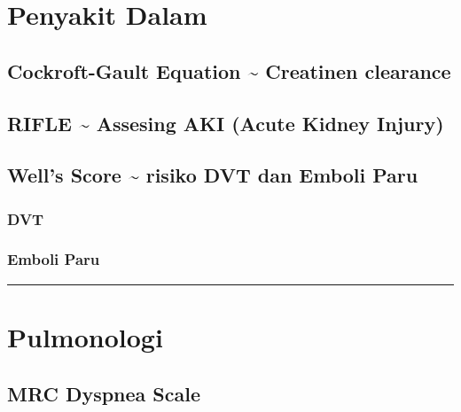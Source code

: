 \documentclass[
]{book}
\begin{document}
\hypertarget{penyakit-dalam}{%
\section{Penyakit Dalam}\label{penyakit-dalam}}

\hypertarget{cockroft-gault-equation-creatinen-clearance}{%
\subsection{Cockroft-Gault Equation \textasciitilde{} Creatinen clearance}\label{cockroft-gault-equation-creatinen-clearance}}

\hypertarget{rifle-assesing-aki-acute-kidney-injury}{%
\subsection{RIFLE \textasciitilde{} Assesing AKI (Acute Kidney Injury)}\label{rifle-assesing-aki-acute-kidney-injury}}

\hypertarget{wells-score-risiko-dvt-dan-emboli-paru}{%
\subsection{Well's Score \textasciitilde{} risiko DVT dan Emboli Paru}\label{wells-score-risiko-dvt-dan-emboli-paru}}

\hypertarget{dvt}{%
\subsubsection{DVT}\label{dvt}}

\hypertarget{emboli-paru}{%
\subsubsection{Emboli Paru}\label{emboli-paru}}

\begin{center}\rule{0.5\linewidth}{0.5pt}\end{center}

\hypertarget{pulmonologi}{%
\section{Pulmonologi}\label{pulmonologi}}

\hypertarget{mrc-dyspnea-scale}{%
\subsection{MRC Dyspnea Scale}\label{mrc-dyspnea-scale}}
\end{document}
